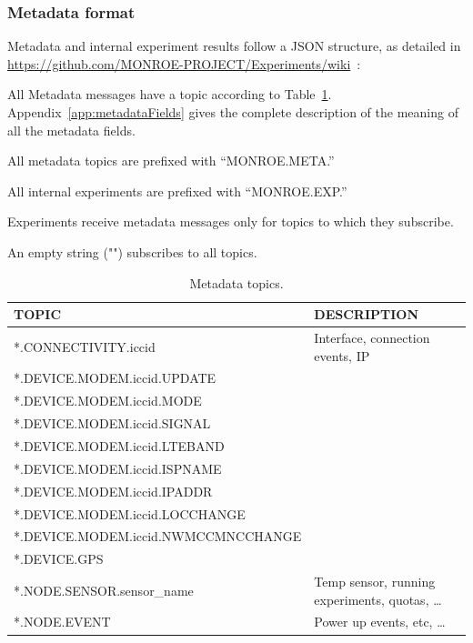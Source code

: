 \documentclass[a4paper,10pt]{article}
\begin{document}
\subsubsection{Metadata format}
Metadata and internal experiment results follow a JSON structure, as detailed in \url{https://github.com/MONROE-PROJECT/Experiments/wiki}~:
\begin{itemize*}
	\item All Metadata messages have a topic according to Table~\ref{tab:metadataTopics}. Appendix~\ref{app:metadataFields} gives the complete description of the meaning of all the metadata fields.
	\item All metadata topics are prefixed with ``MONROE.META.''
	\item All internal experiments are prefixed with ``MONROE.EXP.''
	\item Experiments receive metadata messages only for topics to which they subscribe.
	\item An empty string ("") subscribes to all topics.
\end{itemize*}

\begin{table}[tp]
	\caption{Metadata topics.}\label{tab:metadataTopics}
	\begin{center}
	\begin{tabular}{ll}
		\toprule
		\textbf{TOPIC} & \textbf{DESCRIPTION} \\
		\midrule
		*.CONNECTIVITY.iccid & Interface, connection events, IP \\
		*.DEVICE.MODEM.iccid.UPDATE	& \\
		*.DEVICE.MODEM.iccid.MODE & \\
		*.DEVICE.MODEM.iccid.SIGNAL	& \\
		*.DEVICE.MODEM.iccid.LTEBAND	& \\
		*.DEVICE.MODEM.iccid.ISPNAME	& \\
		*.DEVICE.MODEM.iccid.IPADDR	& \\
		*.DEVICE.MODEM.iccid.LOCCHANGE	& \\
		*.DEVICE.MODEM.iccid.NWMCCMNCCHANGE	& \\
		*.DEVICE.GPS	& \\
		*.NODE.SENSOR.sensor\_name & Temp sensor, running experiments, quotas, \ldots \\
		*.NODE.EVENT & Power up events, etc, \ldots \\
		\bottomrule
	\end{tabular}
	\end{center}
\end{table}
\end{document}

